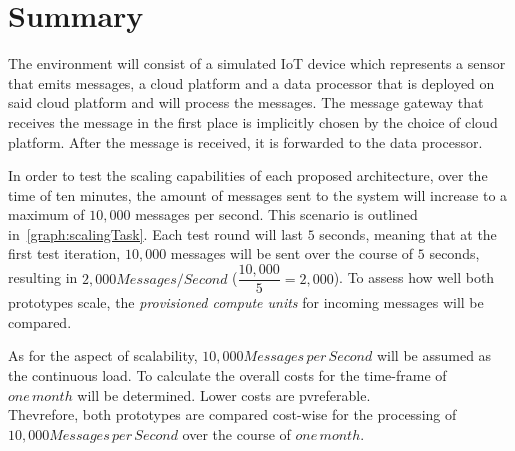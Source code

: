 \section{Summary}

The environment will consist of a simulated IoT device which represents a sensor that emits messages, a cloud platform and a data processor that is deployed on said cloud platform and will process the messages. The message gateway that receives the message in the first place is implicitly chosen by the choice of cloud platform. After the message is received, it is forwarded to the data processor.

In order to test the scaling capabilities of each proposed architecture, over the time of ten minutes, the amount of messages sent to the system will increase to a maximum of $10,000$ messages per second. This scenario is outlined in~\vref{graph:scalingTask}. Each test round will last $5$ seconds, meaning that at the first test iteration, $10,000$ messages will be sent over the course of $5$ seconds, resulting in $2,000Messages/Second$ ($\dfrac{10,000}{5}=2,000$).
To assess how well both prototypes scale, the \textit{provisioned compute units} for incoming messages will be compared. 

As for the aspect of scalability, $10,000 Messages\,per\,Second$ will be assumed as the continuous load. To calculate the overall costs for the time-frame of $one\,month$ will be determined. Lower costs are pvreferable.\\
Thevrefore, both prototypes are compared cost-wise for the processing of $10,000 Messages\,per\,Second$ over the course of $one\,month$. 